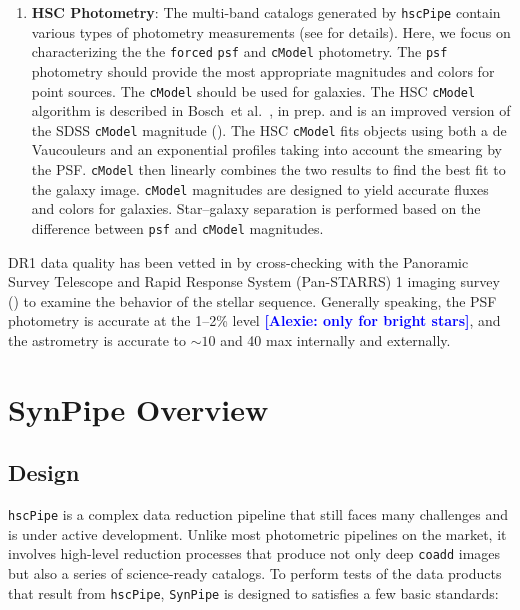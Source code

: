 \documentclass[useamsfonts]{pasj01}
\def\etal{{\ et al.~}}
\newcommand{\alexie}[1]{\textcolor{blue}{\textbf{[Alexie: #1]}}}
\def\hscpipe{\texttt{hscPipe}}
\def\synpipe{\texttt{SynPipe}}
\def\cmodel{\texttt{cModel}}
\def\forced{\texttt{forced}}
\def\coadd{\texttt{coadd}}
\begin{document}
\begin{enumerate}
        \item \textbf{HSC Photometry}:
            The multi-band catalogs generated by \hscpipe{} contain various types of photometry measurements (see \citealt{HSCDR1} for details). Here, we focus on characterizing the the \forced{} \texttt{psf} and \cmodel{}
            photometry. The
            \texttt{psf} photometry should provide the most appropriate magnitudes and
            colors for point sources. The  \cmodel{} should be used for galaxies. The HSC  \cmodel{} algorithm is described in Bosch\etal, in prep. and is an  improved version of the SDSS \cmodel{} magnitude (\citealt{Lupton2001, Abazajian2004}). The HSC  \cmodel{} fits objects using both a de Vaucouleurs and an exponential profiles taking into account the smearing by the PSF.  \cmodel{} then linearly combines the two results to find the best fit to the galaxy image. \cmodel{} magnitudes are designed to yield accurate fluxes and colors for galaxies. Star--galaxy separation is performed based on
            the difference between \texttt{psf} and \cmodel{}{} magnitudes.
    \end{enumerate}

    DR1 data quality has been vetted in \citet{HSCDR1} by cross-checking
    with the Panoramic Survey Telescope and Rapid Response System (Pan-STARRS) 1
    imaging survey (\citealt{Schlafly2012, Tonry2012, Magnier2013}) to examine the
    behavior of the stellar sequence.
    Generally speaking, the PSF photometry is accurate at the 1--2\% level \alexie{only for bright stars}, and the
    astrometry is accurate to ${\sim}10$ and 40 max internally and externally.


\section{SynPipe Overview}
    \label{sec:synpipe}

\subsection{Design}
    \label{ssec:design}

    \hscpipe{} is a complex data reduction pipeline that still faces many challenges
    and is under active development.
    Unlike most photometric pipelines on the market, it involves high-level reduction
    processes that produce not only deep \coadd{} images but also a series of
    science-ready catalogs. To perform tests of the  data products that result from \hscpipe{},  \synpipe{} is designed to satisfies a few basic standards:
\end{document}
